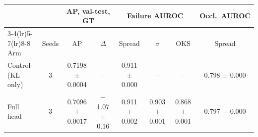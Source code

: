 \begin{tabular}{lccccccc}
\toprule
& & \multicolumn{2}{c}{AP, val-test, GT} & \multicolumn{3}{c}{Failure AUROC} & Occl.\ AUROC \\
\cmidrule(lr){3-4}\cmidrule(lr){5-7}\cmidrule(lr){8-8}
Arm & Seeds & AP & $\Delta$ & Spread & $\sigma$ & OKS & Spread \\
\midrule
Control (KL only) & 3 & 0.7198 $\pm$ 0.0004 & -- & 0.911 $\pm$ 0.000 & -- & -- & 0.798 $\pm$ 0.000 \\
Full head & 3 & 0.7096 $\pm$ 0.0017 & \ensuremath{-}1.07 $\pm$ 0.16 & 0.911 $\pm$ 0.002 & 0.903 $\pm$ 0.001 & 0.868 $\pm$ 0.001 & 0.797 $\pm$ 0.000 \\
\bottomrule
\end{tabular}

